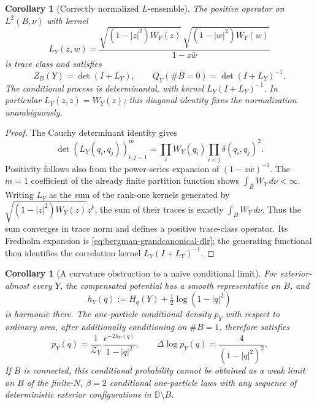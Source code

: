 \documentclass[11pt,a4paper]{article}
\numberwithin{equation}{section}
\newtheorem{corollary}[theorem]{Corollary}
\theoremstyle{definition}
\theoremstyle{remark}
\newcommand{\D}{\mathbb D}
\begin{document}
\begin{corollary}[Correctly normalized $L$-ensemble]
\label{cor:bergman-conditional-lensemble}
The positive operator on $L^2(B,\nu)$ with kernel
\begin{equation}
 L_Y(z,w)=
 \frac{\sqrt{(1-|z|^2)W_Y(z)}\,
       \sqrt{(1-|w|^2)W_Y(w)}}{1-z\bar w}
 \label{eq:bergman-correct-l-kernel}
\end{equation}
is trace class and satisfies
\[
 Z_B(Y)=\det(I+L_Y),\qquad
 Q_Y(\#B=0)=\det(I+L_Y)^{-1}.
\]
The conditional process is determinantal, with kernel
$L_Y(I+L_Y)^{-1}$.  In particular $L_Y(z,z)=W_Y(z)$; this diagonal
identity fixes the normalization unambiguously.
\end{corollary}

\begin{proof}
The Cauchy determinant identity gives
\[
 \det(L_Y(q_i,q_j))_{i,j=1}^m
 =\prod_iW_Y(q_i)\prod_{i<j}\delta(q_i,q_j)^2.
\]
Positivity follows also from the power-series expansion of
$(1-z\bar w)^{-1}$.  The $m=1$ coefficient of the already finite
partition function shows $\int_B W_Y\,d\nu<\infty$.
Writing $L_Y$ as the sum of the rank-one kernels generated by
$\sqrt{(1-|z|^2)W_Y(z)}z^k$, the sum of their traces is exactly
$\int_BW_Y\,d\nu$.  Thus the sum converges in trace norm and
defines a positive trace-class operator.  Its Fredholm expansion is
\eqref{eq:bergman-grandcanonical-dlr}; the generating functional then
identifies the correlation kernel $L_Y(I+L_Y)^{-1}$.
\end{proof}

\begin{corollary}[A curvature obstruction to a naive conditional limit]
\label{cor:bergman-conditional-curvature}
For exterior-almost every $Y$, the compensated potential has a smooth
representative on $B$, and
\[
 h_Y(q):=H_q(Y)+\tfrac12\log(1-|q|^2)
\]
is harmonic there.  The one-particle conditional density $p_Y$ with
respect to ordinary area, after additionally conditioning on $\#B=1$,
therefore satisfies
\begin{equation}
 p_Y(q)=\frac{1}{\mathcal Z_Y}\,
       \frac{e^{-2h_Y(q)}}{1-|q|^2},
 \qquad
 \Delta\log p_Y(q)=\frac4{(1-|q|^2)^2}.
 \label{eq:bergman-onepoint-conditional-curvature}
\end{equation}
If $B$ is connected, this conditional probability cannot be obtained
as a weak limit on $B$ of the finite-$N$, $\beta=2$ conditional
one-particle laws with any sequence of deterministic exterior
configurations in $\D\setminus B$.
\end{corollary}
\end{document}
